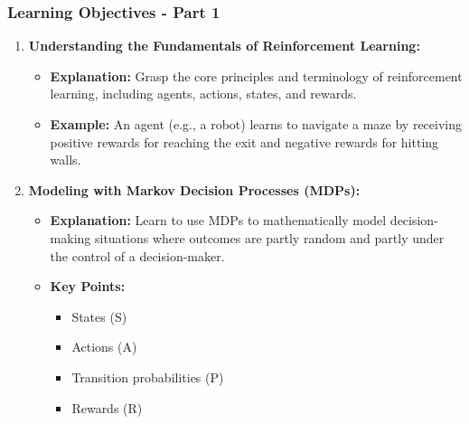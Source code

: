 \documentclass{beamer}
\begin{document}
\begin{frame}[fragile]
    \frametitle{Learning Objectives - Part 1}
    \begin{enumerate}
        \item \textbf{Understanding the Fundamentals of Reinforcement Learning:}
            \begin{itemize}
                \item \textbf{Explanation:} Grasp the core principles and terminology of reinforcement learning, including agents, actions, states, and rewards.
                \item \textbf{Example:} An agent (e.g., a robot) learns to navigate a maze by receiving positive rewards for reaching the exit and negative rewards for hitting walls.
            \end{itemize}

        \item \textbf{Modeling with Markov Decision Processes (MDPs):}
            \begin{itemize}
                \item \textbf{Explanation:} Learn to use MDPs to mathematically model decision-making situations where outcomes are partly random and partly under the control of a decision-maker.
                \item \textbf{Key Points:}
                    \begin{itemize}
                        \item States (S)
                        \item Actions (A)
                        \item Transition probabilities (P)
                        \item Rewards (R)
                    \end{itemize}
            \end{itemize}
    \end{enumerate}
\end{frame}
\end{document}
